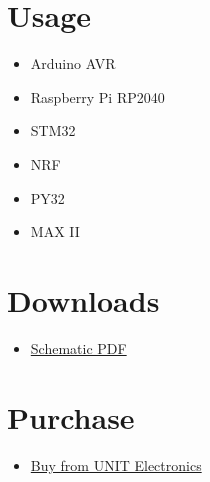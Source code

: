 \documentclass[10pt]{article}
\begin{document}
\section*{Usage}
\begin{itemize}
\item Arduino AVR
\item Raspberry Pi RP2040
\item STM32
\item NRF
\item PY32
\item MAX II
\end{itemize}

\section*{Downloads}
\begin{itemize}
\begin{itemize}
\item \href{../hardware/Schematics_UE0088_Buzzer_SMD-v1.0.pdf}{Schematic PDF}
\end{itemize}
\end{itemize}

\section*{Purchase}
\begin{itemize}
\item \href{https://www.uelectronics.com}{Buy from UNIT Electronics}
\end{itemize}
\end{document}
